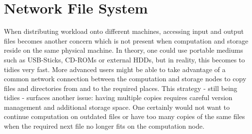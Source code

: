 \section{Network File System}

When distributing workload onto different machines, accessing input and output files becomes another concern which is not present when computation and storage reside on the same physical machine.
In theory, one could use portable mediums such as USB-Sticks, CD-ROMs or external HDDs, but in reality, this becomes to tidies very fast.
More advanced users might be able to take advantage of a common network connection between the computation and storage nodes to copy files and directories from and to the required places.
This strategy - still being tidies - surfaces another issue: having multiple copies requires careful version management and additional storage space.
One certainly would not want to continue computation on outdated files or have too many copies of the same files when the required next file no longer fits on the computation node.

